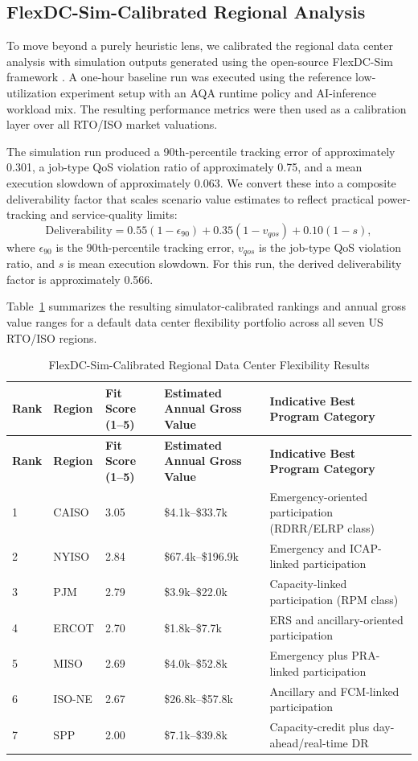 \documentclass[12pt]{article}
\begin{document}
\subsection{FlexDC-Sim-Calibrated Regional Analysis}

To move beyond a purely heuristic lens, we calibrated the regional data center analysis with simulation outputs generated using the open-source FlexDC-Sim framework \citep{flexdc_sim}. A one-hour baseline run was executed using the reference low-utilization experiment setup with an AQA runtime policy and AI-inference workload mix. The resulting performance metrics were then used as a calibration layer over all RTO/ISO market valuations.

The simulation run produced a 90th-percentile tracking error of approximately 0.301, a job-type QoS violation ratio of approximately 0.75, and a mean execution slowdown of approximately 0.063. We convert these into a composite deliverability factor that scales scenario value estimates to reflect practical power-tracking and service-quality limits:
\[
\text{Deliverability} = 0.55(1-\epsilon_{90}) + 0.35(1-v_{qos}) + 0.10(1-s),
\]
where $\epsilon_{90}$ is the 90th-percentile tracking error, $v_{qos}$ is the job-type QoS violation ratio, and $s$ is mean execution slowdown. For this run, the derived deliverability factor is approximately 0.566.

Table~\ref{tab:flexdc_results} summarizes the resulting simulator-calibrated rankings and annual gross value ranges for a default data center flexibility portfolio across all seven US RTO/ISO regions.

\begin{longtable}{p{1.2cm}p{1.8cm}p{2.8cm}p{4cm}p{4.2cm}}
\caption{FlexDC-Sim-Calibrated Regional Data Center Flexibility Results}\label{tab:flexdc_results}\\
\toprule
\textbf{Rank} & \textbf{Region} & \textbf{Fit Score (1--5)} & \textbf{Estimated Annual Gross Value} & \textbf{Indicative Best Program Category} \\
\midrule
\endfirsthead
\toprule
\textbf{Rank} & \textbf{Region} & \textbf{Fit Score (1--5)} & \textbf{Estimated Annual Gross Value} & \textbf{Indicative Best Program Category} \\
\midrule
\endhead
1 & CAISO & 3.05 & \$4.1k--\$33.7k & Emergency-oriented participation (RDRR/ELRP class) \\
\midrule
2 & NYISO & 2.84 & \$67.4k--\$196.9k & Emergency and ICAP-linked participation \\
\midrule
3 & PJM & 2.79 & \$3.9k--\$22.0k & Capacity-linked participation (RPM class) \\
\midrule
4 & ERCOT & 2.70 & \$1.8k--\$7.7k & ERS and ancillary-oriented participation \\
\midrule
5 & MISO & 2.69 & \$4.0k--\$52.8k & Emergency plus PRA-linked participation \\
\midrule
6 & ISO-NE & 2.67 & \$26.8k--\$57.8k & Ancillary and FCM-linked participation \\
\midrule
7 & SPP & 2.00 & \$7.1k--\$39.8k & Capacity-credit plus day-ahead/real-time DR \\
\bottomrule
\end{longtable}
\end{document}
